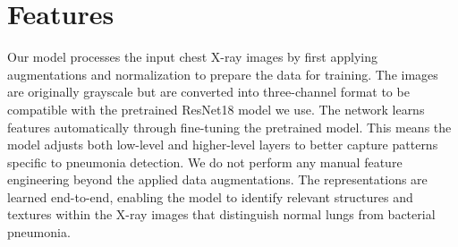 \documentclass[11pt]{article}
\begin{document}
\section{Features}


Our model processes the input chest X-ray images by first applying augmentations and normalization to prepare the data for training. The images are originally grayscale but are converted into three-channel format to be compatible with the pretrained ResNet18 model we use. 
The network learns features automatically through fine-tuning the pretrained model. This means the model adjusts both low-level and higher-level layers to better capture patterns specific to pneumonia detection. We do not perform any manual feature engineering beyond the 
applied data augmentations. The representations are learned end-to-end, enabling the model to identify relevant structures and textures within the X-ray images that distinguish normal lungs from bacterial pneumonia.





\end{document}
